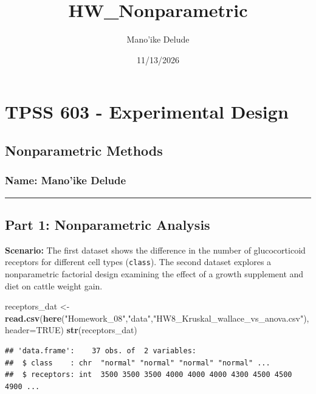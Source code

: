 \documentclass[
]{article}
\title{HW\_Nonparametric}
\author{Mano'ike Delude}
\date{11/13/2026}
\newenvironment{Shaded}{\begin{snugshade}}{\end{snugshade}}
\newcommand{\AttributeTok}[1]{\textcolor[rgb]{0.13,0.29,0.53}{#1}}
\newcommand{\ConstantTok}[1]{\textcolor[rgb]{0.56,0.35,0.01}{#1}}
\newcommand{\FunctionTok}[1]{\textcolor[rgb]{0.13,0.29,0.53}{\textbf{#1}}}
\newcommand{\NormalTok}[1]{#1}
\newcommand{\OtherTok}[1]{\textcolor[rgb]{0.56,0.35,0.01}{#1}}
\newcommand{\StringTok}[1]{\textcolor[rgb]{0.31,0.60,0.02}{#1}}
\begin{document}
\maketitle

\section{TPSS 603 - Experimental
Design}\label{tpss-603---experimental-design}

\subsection{Nonparametric Methods}\label{nonparametric-methods}

\subsubsection{Name: Mano'ike Delude}\label{name-manoike-delude}

\begin{center}\rule{0.5\linewidth}{0.5pt}\end{center}

\subsection{Part 1: Nonparametric
Analysis}\label{part-1-nonparametric-analysis}

\textbf{Scenario:} The first dataset shows the difference in the number
of glucocorticoid receptors for different cell types (\texttt{class}).
The second dataset explores a nonparametric factorial design examining
the effect of a growth supplement and diet on cattle weight gain.

\begin{Shaded}
\begin{Highlighting}[]
\NormalTok{receptors\_dat }\OtherTok{\textless{}{-}} \FunctionTok{read.csv}\NormalTok{(}\FunctionTok{here}\NormalTok{(}\StringTok{"Homework\_08"}\NormalTok{,}\StringTok{"data"}\NormalTok{,}\StringTok{"HW8\_Kruskal\_wallace\_vs\_anova.csv"}\NormalTok{),}\AttributeTok{header=}\ConstantTok{TRUE}\NormalTok{)}
\FunctionTok{str}\NormalTok{(receptors\_dat)}
\end{Highlighting}
\end{Shaded}

\begin{verbatim}
## 'data.frame':    37 obs. of  2 variables:
##  $ class    : chr  "normal" "normal" "normal" "normal" ...
##  $ receptors: int  3500 3500 3500 4000 4000 4000 4300 4500 4500 4900 ...
\end{verbatim}
\end{document}
